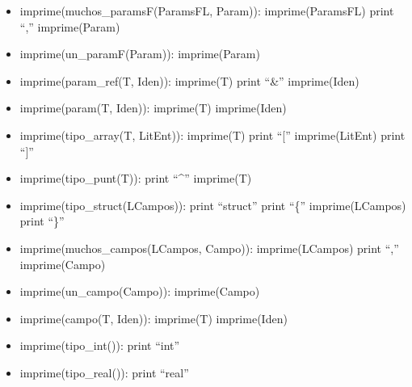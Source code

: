 \documentclass[11pt]{article}
\begin{document}
\begin{itemize}
            \item imprime(muchos\_paramsF(ParamsFL, Param)):
                \subitem imprime(ParamsFL)
                \subitem print “,”
                \subitem imprime(Param)
            
            \item imprime(un\_paramF(Param)):
                \subitem imprime(Param)
            
            \item imprime(param\_ref(T, Iden)):
                \subitem imprime(T)
                \subitem print “\&”
                \subitem imprime(Iden)
            
            \item imprime(param(T, Iden)):
                \subitem imprime(T)
                \subitem imprime(Iden)
            
            \item imprime(tipo\_array(T, LitEnt)):
                \subitem imprime(T)
                \subitem print “[”
                \subitem imprime(LitEnt)
                \subitem print “]”
            
            \item imprime(tipo\_punt(T)):
                \subitem print “\^{}”
                \subitem imprime(T)
            
            \item imprime(tipo\_struct(LCampos)):
                \subitem print “struct”
                \subitem print “\{”
                \subitem imprime(LCampos)
                \subitem print “\}”
            
            \item imprime(muchos\_campos(LCampos, Campo)):
                \subitem imprime(LCampos)
                \subitem print “,”
                \subitem imprime(Campo)
            
            \item imprime(un\_campo(Campo)):
                \subitem imprime(Campo)
            
            \item imprime(campo(T, Iden)):
                \subitem imprime(T)
                \subitem imprime(Iden)
            
            \item imprime(tipo\_int()):
                \subitem print “int”
            
            \item imprime(tipo\_real()):
                \subitem print “real”
            

\end{itemize}
\end{document}

